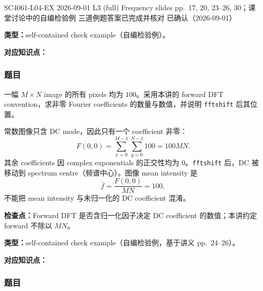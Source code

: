 
\clearpage


\examplemeta
  {SC4061-L04-EX}
  {2026-09-01}
  {L3 (full) Frequency slides pp.~17, 20, 23--26, 30；课堂讨论中的自编检验例}
  {三道例题答案已完成并核对}
  {已确认（2026-09-01）}


\textbf{类型：}self-contained check example（自编检验例）。

\textbf{对应知识点：}

\subsubsection*{题目}

一幅 $M\times N$ image 的所有 pixels 均为 $100$。采用本讲的 forward DFT convention，求非零 Fourier coefficients 的数量与数值，并说明 \texttt{fftshift} 后其位置。

\begin{checkedsolution}
常数图像只含 DC mode，因此只有一个 coefficient 非零：
\[
  F(0,0)=\sum_{x=0}^{M-1}\sum_{y=0}^{N-1}100
  =\boxed{100MN}.
\]
其余 coefficients 因 complex exponentials 的正交性均为 $0$。\texttt{fftshift} 后，DC 被移动到 spectrum centre（频谱中心）。图像 mean intensity 是
\[
  \bar f=\frac{F(0,0)}{MN}=100,
\]
不能把 mean intensity 与未归一化的 DC coefficient 混淆。
\end{checkedsolution}

\textbf{检查点：}Forward DFT 是否含归一化因子决定 DC coefficient 的数值；本讲约定 forward 不除以 $MN$。


\textbf{类型：}self-contained check example（自编检验例，基于讲义 pp.~24--26）。

\textbf{对应知识点：}

\subsubsection*{题目}

